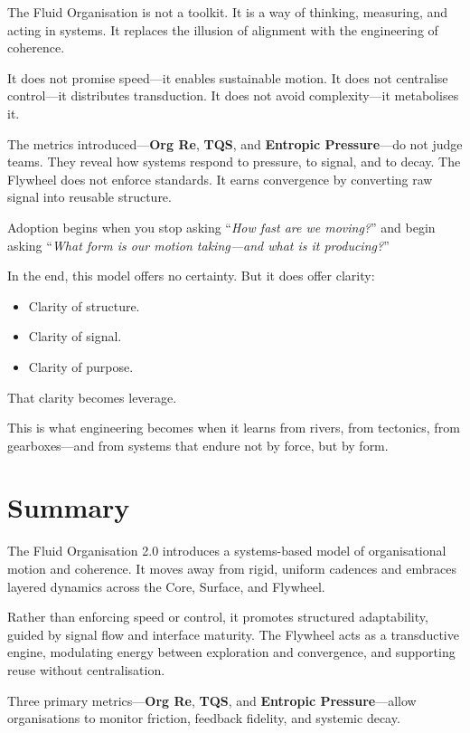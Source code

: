 \documentclass[12pt]{article}
\begin{document}
The Fluid Organisation is not a toolkit. It is a way of thinking, measuring, and acting in systems. It replaces the illusion of alignment with the engineering of coherence.

It does not promise speed—it enables sustainable motion. It does not centralise control—it distributes transduction. It does not avoid complexity—it metabolises it.

The metrics introduced—\textbf{Org Re}, \textbf{TQS}, and \textbf{Entropic Pressure}—do not judge teams. They reveal how systems respond to pressure, to signal, and to decay. The Flywheel does not enforce standards. It earns convergence by converting raw signal into reusable structure.

Adoption begins when you stop asking “\textit{How fast are we moving?}” and begin asking “\textit{What form is our motion taking—and what is it producing?}”

In the end, this model offers no certainty. But it does offer clarity:
\begin{itemize}
    \item Clarity of structure.
    \item Clarity of signal.
    \item Clarity of purpose.
\end{itemize}

That clarity becomes leverage.

This is what engineering becomes when it learns from rivers, from tectonics, from gearboxes—and from systems that endure not by force, but by form.

\newpage
\section*{Summary}


The Fluid Organisation 2.0 introduces a systems-based model of organisational motion and coherence. It moves away from rigid, uniform cadences and embraces layered dynamics across the Core, Surface, and Flywheel.

Rather than enforcing speed or control, it promotes structured adaptability, guided by signal flow and interface maturity. The Flywheel acts as a transductive engine, modulating energy between exploration and convergence, and supporting reuse without centralisation.

Three primary metrics—\textbf{Org Re}, \textbf{TQS}, and \textbf{Entropic Pressure}—allow organisations to monitor friction, feedback fidelity, and systemic decay.
\end{document}
